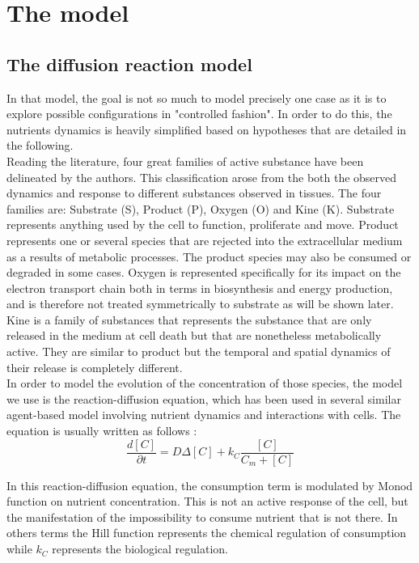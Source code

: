 \documentclass[11pt,a4paper]{article}
\begin{document}
\section{The model}

\subsection{The diffusion reaction model}
In that model, the goal is not so much to model precisely one case as it is to explore possible configurations in "controlled fashion". In order to do this, the nutrients dynamics is heavily simplified based on hypotheses that are detailed in the following.\\

Reading the literature, four great families of active substance have been delineated by the authors. This  classification arose from the both the observed dynamics and response to different substances observed in tissues. The four families are: Substrate (S),  Product (P), Oxygen (O) and Kine (K). Substrate represents anything used by the cell to function, proliferate and move. Product represents one or several species that are rejected into the extracellular medium as a results of metabolic processes. The product species may also be consumed or degraded in some cases. Oxygen is represented specifically for its impact on the electron transport chain both in terms in biosynthesis and energy production, and is therefore not treated symmetrically to substrate as will be shown later. Kine is a family of substances that represents the substance that are only released in the medium at cell death but that are nonetheless metabolically active. They are similar to product but the temporal and spatial dynamics of their release is completely different. \\

In order to model the evolution of the concentration of those species, the model we use is the reaction-diffusion equation, which has been used in several similar agent-based model involving nutrient dynamics and interactions with cells.\cite{Bull2020} 
\cite{Mao2018}\cite{Cleri2019}\cite{Kempf2005}\cite{Kempf2015}
The equation is usually written as follows : 
\[ \frac{d [C]}{\partial t}  =  D \Delta [C] + k_C \frac{[C]}{C_m + [C]} \]

In this reaction-diffusion equation, the consumption term is modulated by Monod function on nutrient concentration. This is not an active response of the cell, but the manifestation of the impossibility to consume nutrient that is not there. In others terms the Hill function represents the chemical regulation of consumption while $k_C$ represents the biological regulation.\\
\end{document}
